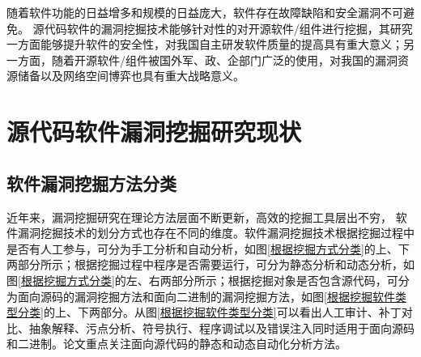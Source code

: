 随着软件功能的日益增多和规模的日益庞大，软件存在故障缺陷和安全漏洞不可避免。
源代码软件的漏洞挖掘技术能够针对性的对开源软件/组件进行挖掘，其研究一方面能够提升软件的安全性，对我国自主研发软件质量的提高具有重大意义；另一方面，随着开源软件/组件被国外军、政、企部门广泛的使用，对我国的漏洞资源储备以及网络空间博弈也具有重大战略意义。




\section{源代码软件漏洞挖掘研究现状}

\subsection{软件漏洞挖掘方法分类}
近年来，漏洞挖掘研究在理论方法层面不断更新，高效的挖掘工具层出不穷，
软件漏洞挖掘技术的划分方式也存在不同的维度。软件漏洞挖掘技术根据挖掘过程中是否有人工参与，可分为手工分析和自动分析，如图\ref{根据挖掘方式分类}的上、下两部分所示；根据挖掘过程中程序是否需要运行，可分为静态分析和动态分析，如图\ref{根据挖掘方式分类}的左、右两部分所示；根据挖掘对象是否包含源代码，可分为面向源码的漏洞挖掘方法和面向二进制的漏洞挖掘方法，如图\ref{根据挖掘软件类型分类}的上、下两部分。从图\ref{根据挖掘软件类型分类}可以看出人工审计、补丁对比、抽象解释、污点分析、符号执行、程序调试以及错误注入同时适用于面向源码和二进制。论文重点关注面向源代码的静态和动态自动化分析方法。

